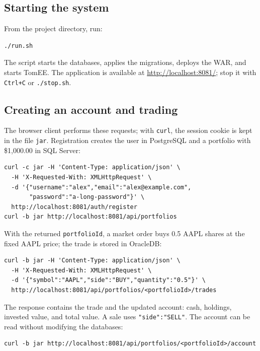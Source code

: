 \documentclass[12pt,a4paper]{article}
\newcommand{\code}[1]{\texttt{\small #1}}
\begin{document}
\subsection{Starting the system}

From the project directory, run:

\begin{verbatim}
./run.sh
\end{verbatim}

The script starts the databases, applies the migrations, deploys the WAR,
and starts TomEE. The application is available at
\url{http://localhost:8081/}; stop it with \code{Ctrl+C} or \code{./stop.sh}.

\subsection{Creating an account and trading}

The browser client performs these requests; with \code{curl}, the session
cookie is kept in the file \code{jar}. Registration creates the user in
PostgreSQL and a portfolio with \$1,000.00 in SQL Server:

\begin{verbatim}
curl -c jar -H 'Content-Type: application/json' \
  -H 'X-Requested-With: XMLHttpRequest' \
  -d '{"username":"alex","email":"alex@example.com",
       "password":"a-long-password"}' \
  http://localhost:8081/auth/register
curl -b jar http://localhost:8081/api/portfolios
\end{verbatim}

With the returned \code{portfolioId}, a market order buys 0.5 AAPL shares at
the fixed AAPL price; the trade is stored in OracleDB:

\begin{verbatim}
curl -b jar -H 'Content-Type: application/json' \
  -H 'X-Requested-With: XMLHttpRequest' \
  -d '{"symbol":"AAPL","side":"BUY","quantity":"0.5"}' \
  http://localhost:8081/api/portfolios/<portfolioId>/trades
\end{verbatim}

The response contains the trade and the updated account: cash, holdings,
invested value, and total value. A sale uses \code{"side":"SELL"}. The
account can be read without modifying the databases:

\begin{verbatim}
curl -b jar http://localhost:8081/api/portfolios/<portfolioId>/account
\end{verbatim}
\end{document}
